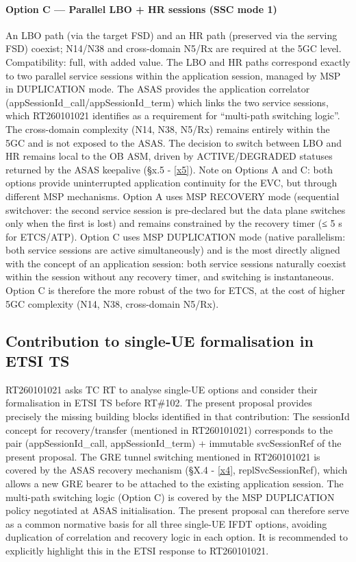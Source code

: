 \documentclass[11pt,a4paper]{article}
\begin{document}
\paragraph{Option C — Parallel LBO + HR sessions (SSC mode 1)}
An LBO path (via the target FSD) and an HR path (preserved via the serving FSD) coexist; N14/N38 and cross-domain N5/Rx are required at the 5GC level.
Compatibility: full, with added value. The LBO and HR paths correspond exactly to two parallel service sessions within the application session, managed by MSP in DUPLICATION mode. The ASAS provides the application correlator (appSessionId\_call\-/\-appSessionId\_term) which links the two service sessions, which RT260101021 identifies as a requirement for “multi-path switching logic”. The cross-domain complexity (N14, N38, N5/Rx) remains entirely within the 5GC and is not exposed to the ASAS. The decision to switch between LBO and HR remains local to the OB ASM, driven by ACTIVE/DEGRADED statuses returned by the ASAS keepalive (§x.5 - \ref{x5}).
Note on Options A and C: both options provide uninterrupted application continuity for the EVC, but through different MSP mechanisms. Option A uses MSP RECOVERY mode (sequential switchover: the second service session is pre-declared but the data plane switches only when the first is lost) and remains constrained by the recovery timer (≤ 5 s for ETCS/ATP). Option C uses MSP DUPLICATION mode (native parallelism: both service sessions are active simultaneously) and is the most directly aligned with the concept of an application session: both service sessions naturally coexist within the session without any recovery timer, and switching is instantaneous. Option C is therefore the more robust of the two for ETCS, at the cost of higher 5GC complexity (N14, N38, cross-domain N5/Rx).
\subsection{Contribution to single-UE formalisation in ETSI TS}
RT260101021 asks TC RT to analyse single-UE options and consider their formalisation in ETSI TS before RT\#102. The present proposal provides precisely the missing building blocks identified in that contribution:
The sessionId concept for recovery/transfer (mentioned in RT260101021) corresponds to the pair (appSessionId\_call, appSessionId\_term) + immutable svcSessionRef of the present proposal.
The GRE tunnel switching mentioned in RT260101021 is covered by the ASAS recovery mechanism (§X.4 - \ref{x4}, replSvcSessionRef), which allows a new GRE bearer to be attached to the existing application session.
The multi-path switching logic (Option C) is covered by the MSP DUPLICATION policy negotiated at ASAS initialisation.
The present proposal can therefore serve as a common normative basis for all three single-UE IFDT options, avoiding duplication of correlation and recovery logic in each option. It is recommended to explicitly highlight this in the ETSI response to RT260101021.
\end{document}
